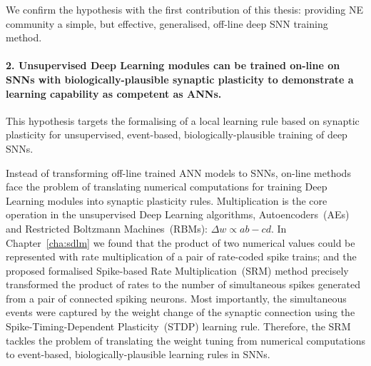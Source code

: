 We confirm the hypothesis with the first contribution of this thesis: providing NE community a simple, but effective, generalised, off-line deep SNN training method.

\paragraph{2. Unsupervised Deep Learning modules can be trained on-line on SNNs with biologically-plausible synaptic plasticity to demonstrate a learning capability as competent as ANNs.}
This hypothesis targets the formalising of a local learning rule based on synaptic plasticity for unsupervised, event-based, biologically-plausible training of deep SNNs. %


Instead of transforming off-line trained ANN models to SNNs, on-line methods face the problem of translating numerical computations for training Deep Learning modules into synaptic plasticity rules.
Multiplication is the core operation in the unsupervised Deep Learning algorithms, Autoencoders~(AEs) and Restricted Boltzmann Machines~(RBMs): $\Delta w \propto ab-cd$.
In Chapter~\ref{cha:sdlm} we found that the product of two numerical values could be represented with rate multiplication of a pair of rate-coded spike trains;
and the proposed formalised Spike-based Rate Multiplication~(SRM) method precisely transformed the product of rates to the number of simultaneous spikes generated from a pair of connected spiking neurons.
Most importantly, the simultaneous events were captured by the weight change of the synaptic connection using the Spike-Timing-Dependent Plasticity~(STDP) learning rule.
Therefore, the SRM tackles the problem of translating the weight tuning from numerical computations to event-based, biologically-plausible learning rules in SNNs.

